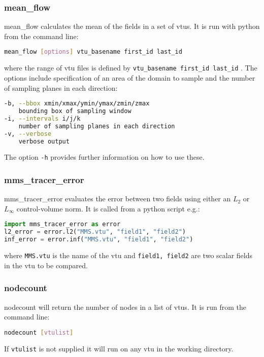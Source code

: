  
\subsubsection{mean\_flow}
\label{sec:mean_flow}

mean\_flow calculates the mean of the fields in a set of vtus. It is run with python from the command line:
\begin{lstlisting}[language = Bash]
mean_flow [options] vtu_basename first_id last_id
\end{lstlisting}
where the range of vtu files is defined by \lstinline[language = python]+vtu_basename first_id last_id+ . 
The options include specification of an area of the domain to sample and the number of sampling planes in each direction:
\begin{lstlisting}[language = Bash]
-b, --bbox xmin/xmax/ymin/ymax/zmin/zmax
	bounding box of sampling window
-i, --intervals i/j/k
	number of sampling planes in each direction
-v, --verbose
   	verbose output
\end{lstlisting}
The option \lstinline[language = Bash]+-h+ provides further information on how to use these.


\subsubsection{mms\_tracer\_error}
\label{sec:mms_tracer_error}

mms\_tracer\_error evaluates the error between two fields using either an $L_2$ or $L_\infty$ control-volume norm. It is called from a python script e.g.:
\begin{lstlisting}[language = python]
import mms_tracer_error as error
l2_error = error.l2("MMS.vtu", "field1", "field2")
inf_error = error.inf("MMS.vtu", "field1", "field2")
\end{lstlisting}
where \lstinline[language = python]+MMS.vtu+ is the name of the vtu and \lstinline[language = python]+field1, field2+ are two scalar fields in the vtu to be compared.


\subsubsection{nodecount}
\label{sec:nodecount}
nodecount will return the number of nodes in a list of vtus. It is run from the command line:
\begin{lstlisting}[language = Bash]
nodecount [vtulist]
\end{lstlisting}
If \lstinline[language = Bash]+vtulist+ is not supplied it will run on any vtu in the working directory.

